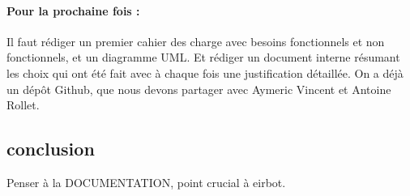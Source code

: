 \documentclass[a4paper,10pt]{article}
\begin{document}
\paragraph{Pour la prochaine fois :}
Il faut rédiger un premier cahier des charge avec besoins fonctionnels et non fonctionnels, et un diagramme UML.
Et rédiger un document interne résumant les choix qui ont été fait avec à chaque fois une justification détaillée.
On a déjà un dépôt Github, que nous devons partager avec Aymeric Vincent et Antoine Rollet.
\subsection*{conclusion}
Penser à la DOCUMENTATION, point crucial à eirbot.
\end{document}
